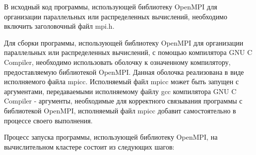 
В исходный код программы, использующей библиотеку OpenMPI для организации параллельных или распределенных вычислений, необходимо включить заголовочный файл mpi.h.

Для сборки программы, использующей библиотеку OpenMPI для организации параллельных или распределенных вычислений, с помощью компилятора GNU C Compiler, необходимо использовать оболочку к означенному компилятору, предоставляемую библиотекой OpenMPI. Данная оболочка реализована в виде исполняемого файла mpicc. Исполняемый файл mpicc может быть запущен с аргументами, передаваемыми исполняемому файлу gcc компилятора GNU C Compiler - аргументы, необходимые для корректного связывания программы с библиотекой OpenMPI, исполняемый файл mpicc добавит самостоятельно в процессе своего выполнения.

Процесс запуска программы, использующей библиотеку OpenMPI, на вычислительном кластере состоит из следующих шагов:

